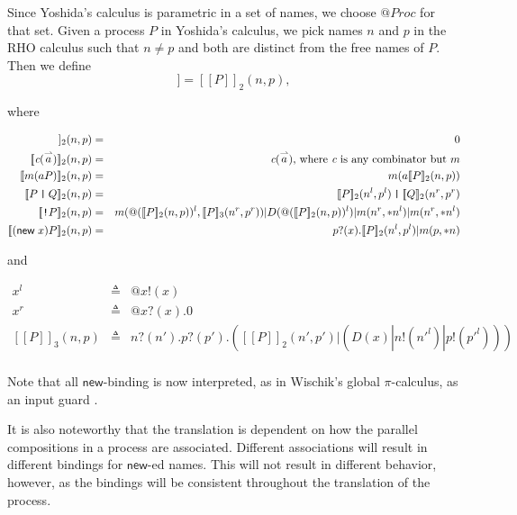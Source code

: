 \documentclass{llncs}
\makeatletter
\newcommand{\new}{\mathsf{new}}
\newcommand{\ldb}{[\![}
\newcommand{\rdb}{]\!]}
\newcommand{\id}[1]{\texttt{#1}}
\newcommand{\pzero}{\mathbin{0}}
\newcommand{\juxtap}{\mathbin{\id{|}}}
\newcommand{\binpar}[2]{#1 | #2}
\newcommand{\outputp}[2]{#1!(#2)}
\newcommand{\prefix}[3]{#1?(#2) . #3}
\newcommand{\quotep}[1]{\mathsf{@}#1}
\newcommand{\meaningof}[1]{\ldb #1 \rdb}
\newcommand{\QProc}{\quotep{\mathbin{Proc}}}
\newcommand{\vect}[1]{\stackrel{\rightharpoonup}{#1}}
\makeatother
\begin{document}
Since Yoshida's calculus is parametric in a set of names, we choose $\QProc$ for that set.
Given a process $P$ in Yoshida's calculus, 
we pick names $n$ and $p$ in the RHO calculus such that $n \neq p$ and
both are distinct from the free names of $P$.  Then we define
\begin{equation*}
  \meaningof{P} = \meaningof{P}_2(n, p),
\end{equation*}

where

\begin{eqnarray*}
    \meaningof{\pzero}_2 (n,p)
      & = &
       \pzero \\
    \meaningof{\emph{c}(\vect{a})}_2 (n,p) 
      & = & 
      \emph{c}(\vect{a})\mbox{, where $\emph{c}$ is any combinator but $m$} \\
    \meaningof{m(aP)}_2 (n,p) 
      & = & 
          m(a \meaningof{P}_2 (n,p)) \\
    \meaningof{P \juxtap Q}_2 (n,p) 
      & = & 
    \meaningof{P}_2 (n^l, p^l)
         \juxtap \meaningof{Q}_2 (n^r, p^r) \\ 
    \meaningof{\id{!} P}_2 (n,p)
          & = & \binpar{m(@(\meaningof{P}_2(n,p))^l, \meaningof{P}_3(n^r,p^r))}
                  {\binpar{D(@(\meaningof{P}_2(n,p))^l)}
                  {\binpar{m(n^r, *n^l)}{m(n^r, *n^l)}}} \\
    \meaningof{(\new \; x ) P}_2 (n, p) 
          & = & 
         \prefix{p}{x}{\binpar{\meaningof{P}_2 ( n^l, p^l )}{m(p, *n)}} 
\end{eqnarray*}

and

\begin{eqnarray*}
  x^l & \triangleq & \quotep{\outputp{x}{x}} \\
  x^r & \triangleq & \quotep{\prefix{x}{x}{\pzero}} \\
  \meaningof{P}_3(n, p) 
    & \triangleq & 
      \prefix{n}{n'}{\prefix{p}{p'}{(\binpar{\meaningof{P}_2(n',p')}
        {(\binpar{D(x)}{\binpar{\outputp{n}{n'^l}}{\outputp{p}{p'^l}}})})}} \\
\end{eqnarray*}

Note that all $\new$-binding is now interpreted, as in Wischik's
global $\pi$-calculus, as an input guard \cite{globalpi}.
	
It is also noteworthy that the translation is dependent on how the
parallel compositions in a process are associated. Different
associations will result in different bindings for $\new$-ed
names. This will not result in different behavior, however, as the
bindings will be consistent throughout the translation of the process.
\end{document}
